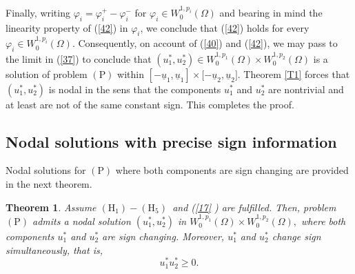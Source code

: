 \documentclass[11pt]{amsart}
\newtheorem{theorem}{Theorem}[section]
\theoremstyle{definition}
\theoremstyle{remark}
\numberwithin{equation}{section}
\begin{document}
Finally, writing $\varphi _{i}=\varphi _{i}^{+}-\varphi _{i}^{-}$ for $%
\varphi _{i}\in W_{0}^{1,p_{i}}(\Omega )$ and bearing in mind the linearity
property of (\ref{42}) in $\varphi _{i}$, we conclude that (\ref{42}) holds
for every $\varphi _{i}\in W_{0}^{1,p_{i}}(\Omega )$. Consequently, on
account of (\ref{40}) and (\ref{42}), we may pass to the limit in (\ref{37})
to conclude that $(u_{1}^{\ast },u_{2}^{\ast })\in W_{0}^{1,p_{1}}(\Omega
)\times W_{0}^{1,p_{2}}(\Omega )$ is a solution of problem $(\mathrm{P})$
within $[-\underline{u}_{1},\underline{u}_{1}]\times \lbrack -\underline{u}%
_{2},\underline{u}_{2}]$. Theorem \ref{T1} forces that $(u_{1}^{\ast
},u_{2}^{\ast })$ is nodal in the sens that the components $u_{1}^{\ast }$
and $u_{2}^{\ast }$ are nontrivial and at least are not of the same constant
sign. This completes the proof.

\subsection{Nodal solutions with precise sign information}

Nodal solutions for $(\mathrm{P})$ where both components are sign changing
are provided in the next theorem.

\begin{theorem}
\label{T4} Assume $(\mathrm{H}_{1})-(\mathrm{H}_{5})$\textrm{\ }and (\ref{17}
) are fulfilled. Then, problem $(\mathrm{P})$ admits a nodal solution $%
(u_{1}^{\ast },u_{2}^{\ast })$ in $W_{0}^{1,p_{1}}(\Omega )\times
W_{0}^{1,p_{2}}(\Omega ),$ where both components $u_{1}^{\ast }$ and $%
u_{2}^{\ast }$ are sign changing. Moreover, $u_{1}^{\ast }$ and $u_{2}^{\ast
}$ change sign simultaneously, that is, 
\begin{equation}
u_{1}^{\ast }u_{2}^{\ast }\geq 0.  \label{55}
\end{equation}
\end{theorem}
\end{document}
